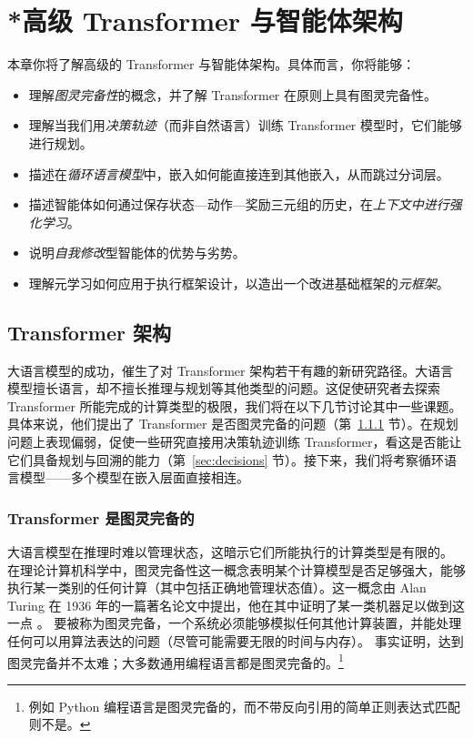 

\chapter[*高级 Transformer 与智能体架构]{*高级 Transformer 与智能体架构}\label{chap:arch}

\begin{learningbox}
本章你将了解高级的 Transformer 与智能体架构。具体而言，你将能够：
\begin{itemize}[leftmargin=*, nosep]
    \item 理解{\em 图灵完备性}的概念，并了解 Transformer 在原则上具有图灵完备性。
    \item 理解当我们用{\em 决策轨迹}（而非自然语言）训练 Transformer 模型时，它们能够进行规划。
    \item 描述在{\em 循环语言模型}中，嵌入如何能直接连到其他嵌入，从而跳过分词层。
    \item 描述智能体如何通过保存状态—动作—奖励三元组的历史，在{\em 上下文中进行强化学习}。
    \item 说明{\em 自我修改}型智能体的优势与劣势。
    \item 理解元学习如何应用于执行框架设计，以造出一个改进基础框架的{\em 元框架}。
\end{itemize}
\end{learningbox}

\section{Transformer 架构}
大语言模型的成功，催生了对 Transformer 架构若干有趣的新研究路径。大语言模型擅长语言，却不擅长推理与规划等其他类型的问题。这促使研究者去探索 Transformer 所能完成的计算类型的极限，我们将在以下几节讨论其中一些课题。具体来说，他们提出了 Transformer 是否图灵完备的问题（第~\ref{sec:turing} 节）。在规划问题上表现偏弱，促使一些研究直接用决策轨迹训练 Transformer，看这是否能让它们具备规划与回溯的能力（第~\ref{sec:decisions} 节）。接下来，我们将考察循环语言模型——多个模型在嵌入层面直接相连。


\subsection{Transformer 是图灵完备的}\label{sec:turing}
大语言模型在推理时难以管理状态，这暗示它们所能执行的计算类型是有限的。%
在理论计算机科学中，图灵完备性这一概念表明某个计算模型是否足够强大，能够执行某一类别的任何计算（其中包括正确地管理状态值）。这一概念由 Alan Turing 在 1936 年的一篇著名论文中提出，他在其中证明了某一类机器足以做到这一点 \citep{turing1936computable}。
要被称为图灵完备，一个系统必须能够模拟任何其他计算装置，并能处理任何可以用算法表达的问题（尽管可能需要无限的时间与内存）。
事实证明，达到图灵完备并不太难；大多数通用编程语言都是图灵完备的。\footnote{例如 Python 编程语言是图灵完备的，而不带反向引用的简单正则表达式匹配则不是。}

